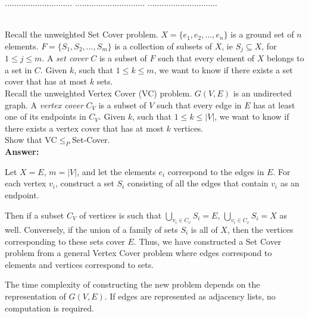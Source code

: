 \documentclass[a4paper,11pt]{article}
\begin{document}
\pagebreak

 $.............................$
 $..............................$
          $..............................$\\

\bigskip

\\
Recall the unweighted Set Cover problem. $X = \{ e_1 , e_2 , \ldots, e_n \}$ is a ground set of $n$ elements. 
$F = \{   S_1, S_2, \ldots , S_m  \}$ is a collection of subsets of $X$, 
ie $S_j \subseteq X$, for $1 \leq j \leq m  $.
A {\em set cover} $C$ is a subset of $F$ such that every element of $X$ belongs to a set in $C$. 
Given $k$, such that $1 \leq k \leq m$, we want to know if there exists a set cover that has at most $k$ sets.\\
Recall the unweighted Vertex Cover (VC) problem. $G(V,E)$ is an undirected graph. 
A {\em vertex cover} $C_V$ is a subset of $V$ such that every edge in $E$ has at least one of its endpoints 
in $C_V$. Given $k$, such that $1 \leq k \leq |V|$, we want to know if there exists a vertex cover that has at most $k$ vertices.\\
Show that VC$\leq_P$Set-Cover.\\
{\bf Answer:} \par
Let $X = E$, $m = |V|$, and let the elements $e_i$ correspond to the edges in $E$. For each vertex $v_i$, construct a set $S_i$ consisting of all the edges that contain $v_i$ as an endpoint.
\iffalse
    Isolated vertices are a special case -- we will handle them by adding the isolated vertices to every $S_i$.
\fi
Then if a subset $C_V$ of vertices is such that $\bigcup_{v_i \in C_v} S_i = E$, $\bigcup_{v_i \in C_v} S_i = X$ as well. Conversely, if the union of a family of sets $S_i$ is all of $X$, then the vertices corresponding to these sets cover $E$. Thus, we have constructed a Set Cover problem from a general Vertex Cover problem where edges correspond to elements and vertices correspond to sets. \par
The time complexity of constructing the new problem depends on the representation of $G(V, E)$. If edges are represented as adjacency lists, no computation is required.
\end{document}
